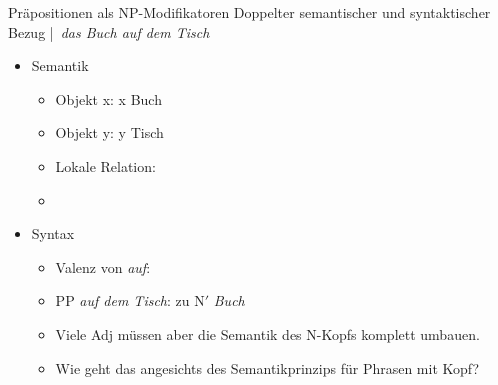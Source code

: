 \begin{frame}
  {Präpositionen als NP-Modifikatoren}
  \onslide<+->
  \onslide<+->
  Doppelter semantischer und syntaktischer Bezug |\onslide<+->\ \alert{\textit{das Buch auf dem Tisch}}\\
  \Halbzeile
  \begin{itemize}[<+->]
    \item Semantik
      \Viertelzeile
      \begin{itemize}[<+->]
        \item Objekt x: x  Buch
        \item Objekt y: y  Tisch
        \item Lokale Relation: 
        \item %
      \end{itemize}
      \Halbzeile
    \item Syntax
      \begin{itemize}[<+->]
        \item Valenz von \textit{auf}: %
        \item PP \textit{auf dem Tisch}:  zu N$'$ \textit{Buch}
        \item Viele Adj müssen aber die Semantik des N-Kopfs komplett umbauen.
        \item Wie geht das angesichts des Semantikprinzips für Phrasen mit Kopf?
      \end{itemize}
  \end{itemize}
\end{frame}

